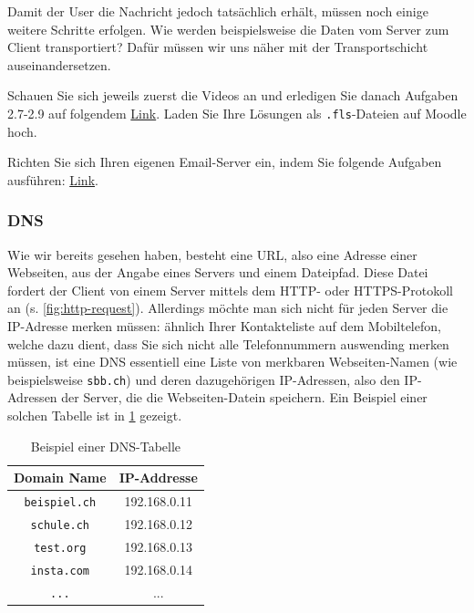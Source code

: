 Damit der User die Nachricht jedoch tatsächlich erhält, müssen noch einige weitere Schritte erfolgen. Wie werden beispielsweise die Daten vom Server zum Client transportiert? Dafür müssen wir uns näher mit der Transportschicht auseinandersetzen.

\begin{mysubmission}
	Schauen Sie sich jeweils zuerst die Videos an und erledigen Sie danach Aufgaben 2.7-2.9 auf folgendem \href{https://informatik.mygymer.ch/base/?book=network}{Link}. Laden Sie Ihre Lösungen als \texttt{.fls}-Dateien auf Moodle hoch.
\end{mysubmission}

\begin{mychallenge}
	Richten Sie sich Ihren eigenen Email-Server ein, indem Sie folgende Aufgaben ausführen: \href{https://inf-schule.de/rechnernetze/filius/internet/exkurs_email}{Link}.
\end{mychallenge}

\subsubsection{DNS}
Wie wir bereits gesehen haben, besteht eine \gls{URL}, also eine Adresse einer Webseiten, aus der Angabe eines Servers und einem Dateipfad. Diese Datei fordert der Client von einem Server mittels dem \gls{HTTP}- oder \gls{HTTPS}-Protokoll an (s. \cref{fig:http-request}). Allerdings möchte man sich nicht für jeden Server die IP-Adresse merken müssen: ähnlich Ihrer Kontakteliste auf dem Mobiltelefon, welche dazu dient, dass Sie sich nicht alle Telefonnummern auswending merken müssen, ist eine \gls{DNS} essentiell eine Liste von merkbaren Webseiten-Namen (wie beispielsweise \texttt{sbb.ch}) und deren dazugehörigen \gls{IP}-Adressen, also den \gls{IP}-Adressen der Server, die die Webseiten-Datein speichern. Ein Beispiel einer solchen Tabelle ist in \cref{tab:dnsEntries} gezeigt.

\begin{table}[H]
	\centering
	\begin{tabular}{c|c}
		\textbf{Domain Name} & \textbf{IP-Addresse} \\
		\midrule\midrule
		\texttt{beispiel.ch} & 192.168.0.11         \\
		\midrule
		\texttt{schule.ch}   & 192.168.0.12         \\
		\midrule
		\texttt{test.org}    & 192.168.0.13         \\
		\midrule
		\texttt{insta.com}   & 192.168.0.14         \\
		\midrule
		\texttt{...}         & ...                  \\
	\end{tabular}
	\caption{Beispiel einer \gls{DNS}-Tabelle}
	\label{tab:dnsEntries}
\end{table}

